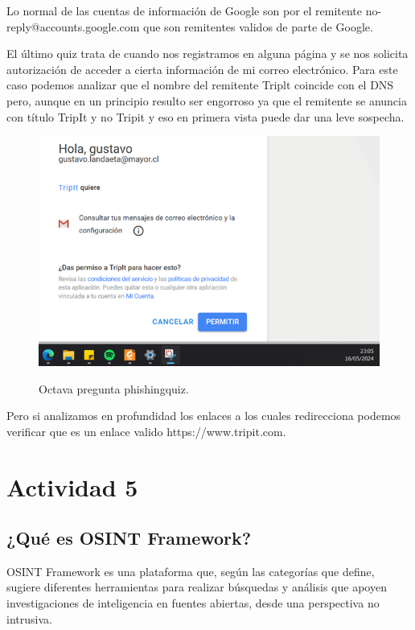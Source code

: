 \documentclass[stu, 11pt, letterpaper, donotrepeattitle, floatsintext, natbib]{apa7}
\begin{document}
Lo normal de las cuentas de información de Google son por el remitente no-reply@accounts.google.com que son remitentes validos de parte de Google.

El último quiz trata de cuando nos registramos en alguna página y se nos solicita autorización de acceder a cierta información de mi correo electrónico. Para este caso podemos analizar que el nombre del remitente Triplt coincide con el DNS pero, aunque en un principio resulto ser engorroso ya que el remitente se anuncia con título TripIt y no Tripit y eso en primera vista puede dar una leve sospecha.

\begin{figure}[H]
    \centering
    \caption{Octava pregunta phishingquiz.}
    \includegraphics[width=0.75\linewidth]{phishing11.png} %
    \label{fig:OverallEffect}
\end{figure}

Pero si analizamos en profundidad los enlaces a los cuales redirecciona podemos verificar que es un enlace valido https://www.tripit.com.

\newpage

\section{\large Actividad 5}

\subsection{¿Qué es OSINT Framework?}

OSINT Framework es una plataforma que, según las categorías que define, sugiere diferentes herramientas para realizar búsquedas y análisis que apoyen investigaciones de inteligencia en fuentes abiertas, desde una perspectiva no intrusiva.
\end{document}
